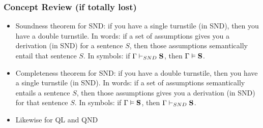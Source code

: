 \begin{frame}
\frametitle{Concept Review (if totally lost)}

\begin{itemize}

\item Soundness theorem for SND: if you have a single turnstile (in SND), then you have a double turnstile. In words: if a set of assumptions gives you a derivation (in SND) for a sentence $S$, then those assumptions semantically entail that sentence $S $. In symbols: if $\Gamma \vdash_{SND} \mathbf{S} $, then $\Gamma \vDash \mathbf{S} $. 

\item Completeness theorem for SND: if you have a double turnstile, then you have a single turnstile (in SND). In words: if a set of assumptions semantically entails a sentence $S$, then those assumptions gives you a derivation (in SND) for that sentence $S $. In symbols: if $\Gamma \vDash \mathbf{S} $, then $\Gamma \vdash_{SND} \mathbf{S} $.

\item Likewise for QL and QND  



\end{itemize}
\end{frame}


